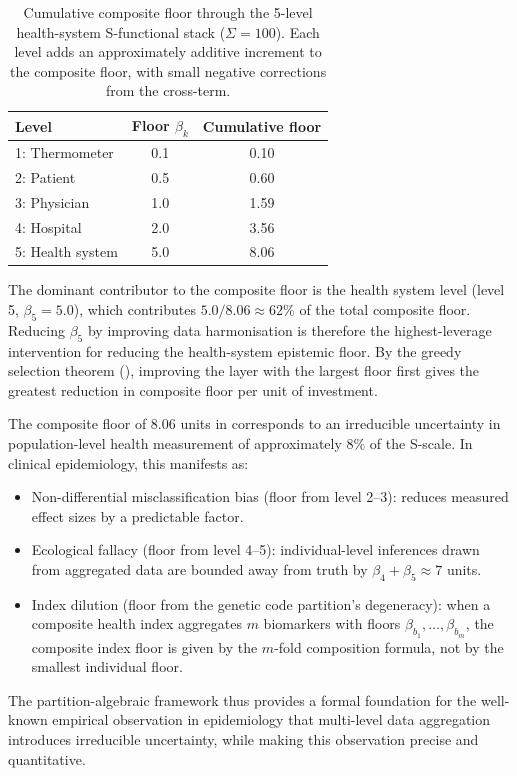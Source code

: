 \begin{example}
\begin{table}[ht]
\centering
\begin{tabular}{lcc}
\toprule
Level & Floor $\beta_k$ & Cumulative floor \\
\midrule
1: Thermometer   & 0.1  & 0.10 \\
2: Patient       & 0.5  & 0.60 \\
3: Physician     & 1.0  & 1.59 \\
4: Hospital      & 2.0  & 3.56 \\
5: Health system & 5.0  & 8.06 \\
\bottomrule
\end{tabular}
\caption{Cumulative composite floor through the 5-level health-system
S-functional stack ($\Sigma = 100$).  Each level adds an approximately
additive increment to the composite floor, with small negative corrections
from the cross-term.}
\label{tab:ch02-health-stack}
\end{table}

The dominant contributor to the composite floor is the health system level
(level 5, $\beta_5 = 5.0$), which contributes $5.0/8.06 \approx 62\%$ of
the total composite floor.  Reducing $\beta_5$ by improving data harmonisation
is therefore the highest-leverage intervention for reducing the health-system
epistemic floor.  By the greedy selection theorem (),
improving the layer with the largest floor first gives the greatest reduction
in composite floor per unit of investment.
\end{example}

\begin{remark}
\label{rem:ch02-floor-epidemiology}
The composite floor of $8.06$ units in 
corresponds to an irreducible uncertainty in population-level health measurement
of approximately $8\%$ of the S-scale.  In clinical epidemiology, this manifests
as:
\begin{itemize}
  \item Non-differential misclassification bias (floor from level 2--3): reduces
    measured effect sizes by a predictable factor.
  \item Ecological fallacy (floor from level 4--5): individual-level inferences
    drawn from aggregated data are bounded away from truth by $\beta_4 + \beta_5
    \approx 7$ units.
  \item Index dilution (floor from the genetic code partition's degeneracy): when
    a composite health index aggregates $m$ biomarkers with floors
    $\beta_{b_1}, \ldots, \beta_{b_m}$, the composite index floor is given by
    the $m$-fold composition formula, not by the smallest individual floor.
\end{itemize}
The partition-algebraic framework thus provides a formal foundation for the
well-known empirical observation in epidemiology that multi-level data
aggregation introduces irreducible uncertainty, while making this observation
precise and quantitative.
\end{remark}

